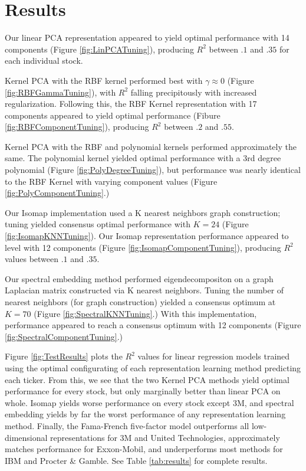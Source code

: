 \documentclass[a4paper]{article}
\begin{document}
   \section{Results}
   \par Our linear PCA representation appeared to yield optimal performance with 14 components (Figure \ref{fig:LinPCATuning}), producing $R^2$ between $.1$ and $.35$ for each individual stock.  
   \par Kernel PCA with the RBF kernel performed best with $\gamma \approx 0$ (Figure \ref{fig:RBFGammaTuning}), with $R^2$ falling precipitously with increased regularization. Following this, the RBF Kernel representation with 17 components appeared to yield optimal performance (Fibure \ref{fig:RBFComponentTuning}), producing $R^2$ between $.2$ and $.55$.
   \par Kernel PCA with the RBF and polynomial kernels performed approximately the same. The polynomial kernel yielded optimal performance with a 3rd degree polynomial (Figure \ref{fig:PolyDegreeTuning}), but performance was nearly identical to the RBF Kernel with varying component values (Figure \ref{fig:PolyComponentTuning}.)
   \par Our Isomap implementation used a K nearest neighbors graph construction; tuning yielded consensus optimal performance with $K= 24$ (Figure \ref{fig:IsomapKNNTuning}). Our Isomap representation performance appeared to level with 12 components (Figure \ref{fig:IsomapComponentTuning}), producing $R^2$ values between $.1$ and $.35$.
   \par Our spectral embedding method performed eigendecompositon on a graph Laplacian matrix constructed via K nearest neighbors. Tuning the number of nearest neighbors (for graph construction) yielded a consensus optimum at $K=70$ (Figure \ref{fig:SpectralKNNTuning}.) With this implementation, performance appeared to reach a consensus optimum with 12 components (Figure \ref{fig:SpectralComponentTuning}.)
   \par Figure \ref{fig:TestResults} plots the $R^2$ values for linear regression models trained using the optimal configurating of each representation learning method predicting each ticker. From this, we see that the two Kernel PCA methods yield optimal performance for every stock, but only marginally better than linear PCA on whole. Isomap yields worse performance on every stock except 3M, and spectral embedding yields by far the worst performance of any representation learning method. Finally, the Fama-French five-factor model outperforms all low-dimensional representations for 3M and United Technologies, approximately matches performance for Exxon-Mobil, and underperforms most methods for IBM and Procter \& Gamble. See Table \ref{tab:results} for complete results.
\end{document}
